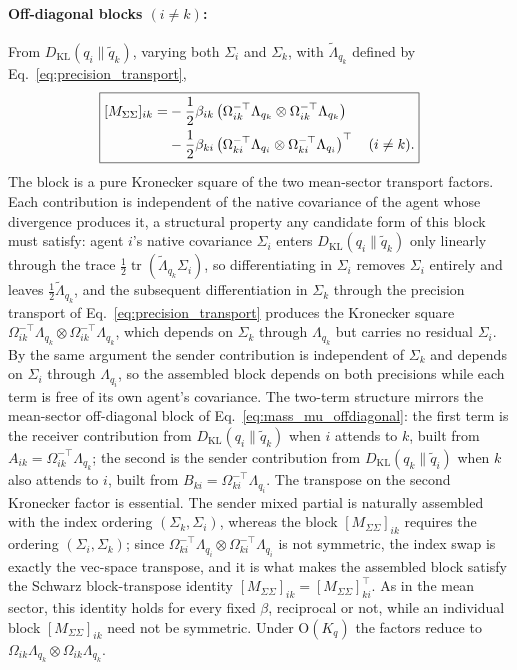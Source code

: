 \paragraph{Off-diagonal blocks $(i \neq k)$:} From $D_{\mathrm{KL}}(q_i \| \tilde{q}_k)$, varying both $\Sigma_i$ and $\Sigma_k$, with $\tilde{\Lambda}_{q_k}$ defined by Eq.~\eqref{eq:precision_transport},
\begin{equation}
\boxed{\begin{aligned}
\relax [M_{\Sigma\Sigma}]_{ik} = &-\frac{1}{2}\beta_{ik}\left(\Omega_{ik}^{-\top}\Lambda_{q_k} \otimes \Omega_{ik}^{-\top}\Lambda_{q_k}\right) \\
&-\frac{1}{2}\beta_{ki}\left(\Omega_{ki}^{-\top}\Lambda_{q_i} \otimes \Omega_{ki}^{-\top}\Lambda_{q_i}\right)^\top \quad (i \neq k).
\end{aligned}}
\label{eq:mass_sigma_offdiagonal}
\end{equation}
The block is a pure Kronecker square of the two mean-sector transport factors. Each contribution is independent of the native covariance of the agent whose divergence produces it, a structural property any candidate form of this block must satisfy: agent $i$'s native covariance $\Sigma_i$ enters $D_{\mathrm{KL}}(q_i \| \tilde{q}_k)$ only linearly through the trace $\frac{1}{2}\operatorname{tr}(\tilde{\Lambda}_{q_k}\Sigma_i)$, so differentiating in $\Sigma_i$ removes $\Sigma_i$ entirely and leaves $\frac{1}{2}\tilde{\Lambda}_{q_k}$, and the subsequent differentiation in $\Sigma_k$ through the precision transport of Eq.~\eqref{eq:precision_transport} produces the Kronecker square $\Omega_{ik}^{-\top}\Lambda_{q_k} \otimes \Omega_{ik}^{-\top}\Lambda_{q_k}$, which depends on $\Sigma_k$ through $\Lambda_{q_k}$ but carries no residual $\Sigma_i$. By the same argument the sender contribution is independent of $\Sigma_k$ and depends on $\Sigma_i$ through $\Lambda_{q_i}$, so the assembled block depends on both precisions while each term is free of its own agent's covariance. The two-term structure mirrors the mean-sector off-diagonal block of Eq.~\eqref{eq:mass_mu_offdiagonal}: the first term is the receiver contribution from $D_{\mathrm{KL}}(q_i \| \tilde{q}_k)$ when $i$ attends to $k$, built from $A_{ik} = \Omega_{ik}^{-\top}\Lambda_{q_k}$; the second is the sender contribution from $D_{\mathrm{KL}}(q_k \| \tilde{q}_i)$ when $k$ also attends to $i$, built from $B_{ki} = \Omega_{ki}^{-\top}\Lambda_{q_i}$. The transpose on the second Kronecker factor is essential. The sender mixed partial is naturally assembled with the index ordering $(\Sigma_k, \Sigma_i)$, whereas the block $[M_{\Sigma\Sigma}]_{ik}$ requires the ordering $(\Sigma_i, \Sigma_k)$; since $\Omega_{ki}^{-\top}\Lambda_{q_i} \otimes \Omega_{ki}^{-\top}\Lambda_{q_i}$ is not symmetric, the index swap is exactly the vec-space transpose, and it is what makes the assembled block satisfy the Schwarz block-transpose identity $[M_{\Sigma\Sigma}]_{ik} = [M_{\Sigma\Sigma}]_{ki}^\top$. As in the mean sector, this identity holds for every fixed $\beta$, reciprocal or not, while an individual block $[M_{\Sigma\Sigma}]_{ik}$ need not be symmetric. Under $\mathrm{O}(K_q)$ the factors reduce to $\Omega_{ik}\Lambda_{q_k} \otimes \Omega_{ik}\Lambda_{q_k}$.

